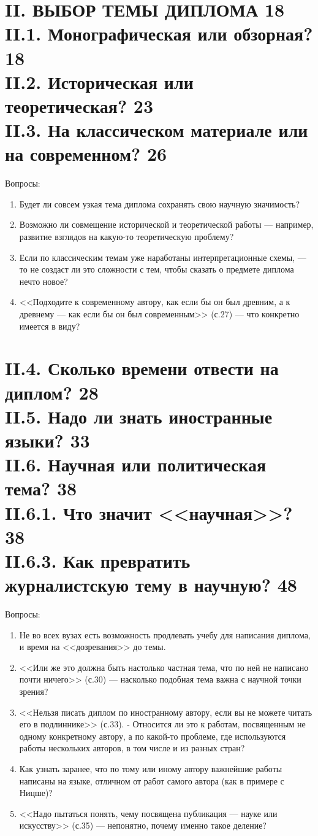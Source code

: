 \documentclass{../../common/thesisbyxetex}
\begin{document}
\section*{II. \uppercase{Выбор темы диплома} 18\\
II.1. Монографическая или обзорная? 18 \\
II.2. Историческая или теоретическая? 23 \\
II.3. На классическом материале или на современном? 26}
Вопросы:
\begin{enumerate}
\item Будет ли совсем узкая тема диплома сохранять свою научную значимость?

\item  Возможно ли совмещение исторической и теоретической работы --- например, развитие взглядов на какую-то
теоретическую проблему?

\item  Если по классическим темам уже наработаны интерпретационные схемы, --- то не создаст ли это сложности с тем,
чтобы сказать о предмете диплома нечто новое?

\item  <<Подходите к современному автору, как если бы он был древним, а к древнему --- как если бы он был современным>>
(с.27) --- что конкретно имеется в виду?
\end{enumerate}

\section*{II.4. Сколько времени отвести на диплом? 28 \\
II.5. Надо ли знать иностранные языки? 33 \\
II.6. Научная или политическая тема? 38 \\
II.6.1. Что значит <<научная>>? 38 \\
II.6.3. Как превратить журналистскую тему в научную? 48}
Вопросы:
\begin{enumerate}
\item Не во всех вузах есть возможность продлевать учебу для написания диплома, и время на <<дозревания>> до темы.

\item <<Или же это должна быть настолько частная тема, что по ней не написано почти ничего>> (с.30) --- насколько
подобная тема важна с научной точки зрения?

\item  <<Нельзя писать диплом по иностранному автору, если вы не
можете читать его в подлиннике>> (с.33). - Относится ли это к работам, посвященным не одному конкретному автору, а по
какой-то проблеме, где используются работы нескольких авторов, в том числе и из разных стран?

\item Как узнать заранее, что по тому или иному автору важнейшие работы написаны на языке, отличном от работ самого
автора (как в примере с Ницше)?

\item <<Надо пытаться понять, чему посвящена публикация --- науке или искусству>> (с.35) --- непонятно, почему именно
такое деление?
\end{enumerate}
\end{document}
